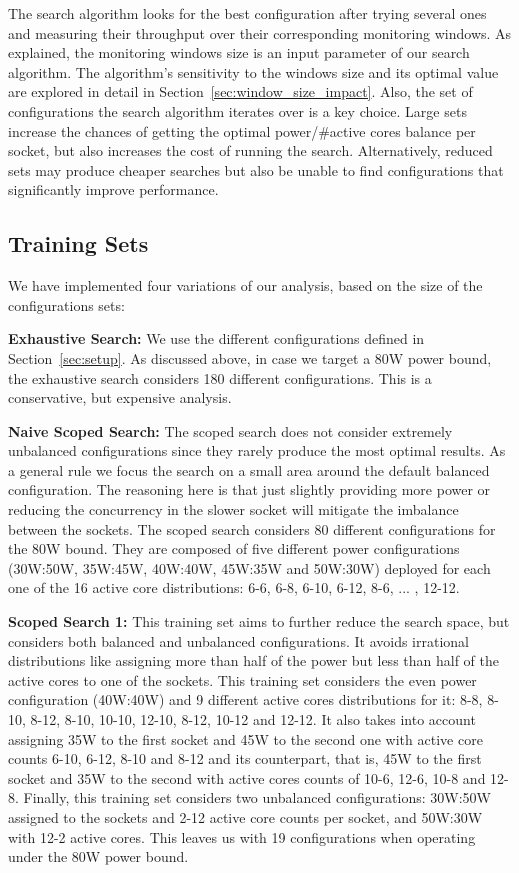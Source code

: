 The search algorithm looks for the best configuration after trying several ones and
measuring their throughput over their corresponding monitoring windows.  As explained, the
monitoring windows size is an input parameter of our search algorithm.  The algorithm's
sensitivity to the windows size and its optimal value are explored in detail in
Section~\ref{sec:window_size_impact}.  Also, the set of configurations the search
algorithm iterates over is a key choice.  Large sets increase the chances of getting the
optimal power/\#active cores balance per socket, but also increases the cost of running
the search.  Alternatively, reduced sets may produce cheaper searches but also be unable
to find configurations that significantly improve performance. 

\subsection{Training Sets}
\label{sec:searchspaces}
We have implemented four variations of our analysis, based on the size of the configurations sets:

\textbf{Exhaustive Search:} We use the different configurations defined in
Section~\ref{sec:setup}.  As discussed above, in case we target a 80W power bound, the
exhaustive search considers 180 different configurations.  This is a conservative, but
expensive analysis. 


\textbf{Naive Scoped Search:} The scoped search does not consider extremely unbalanced
configurations since they rarely produce the most optimal results.  As a general rule we
focus the search on a small area around the default balanced configuration.  The reasoning
here is that just slightly providing more power or reducing the concurrency in the slower
socket will mitigate the imbalance between the sockets.  The scoped search considers 80
different configurations for the 80W bound.  They are composed of five different power
configurations (30W:50W, 35W:45W, 40W:40W, 45W:35W and 50W:30W) deployed for each one of
the 16 active core distributions: 6-6, 6-8, 6-10, 6-12, 8-6, ... , 12-12.

\textbf{Scoped Search 1:}
This training set aims to further reduce the search space, but considers both balanced and
unbalanced configurations.  It avoids irrational distributions like assigning more than
half of the power but less than half of the active cores to one of the sockets.  This
training set considers the even power configuration (40W:40W) and 9 different active cores
distributions for it: 8-8, 8-10, 8-12, 8-10, 10-10, 12-10, 8-12, 10-12 and 12-12.  It also
takes into account assigning 35W to the first socket and 45W to the second one with active
core counts 6-10, 6-12, 8-10 and 8-12 and its counterpart, that is, 45W to the first
socket and 35W to the second with active cores counts of 10-6, 12-6, 10-8 and 12-8.
Finally, this training set considers two unbalanced configurations: 30W:50W assigned to
the sockets and 2-12 active core counts per socket, and 50W:30W with 12-2 active cores.
This leaves us with 19 configurations when operating under the 80W power bound.

